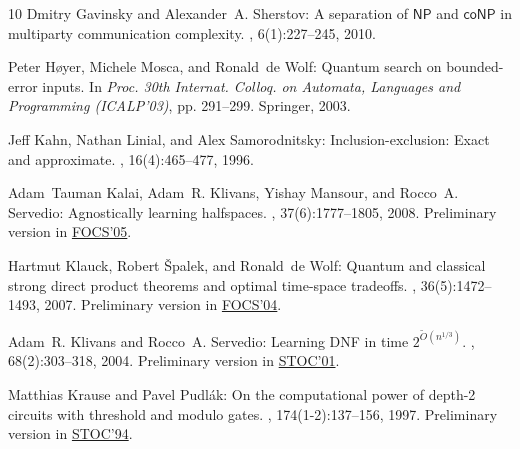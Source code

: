 \begin{thebibliography}{10}
{\sc Dmitry Gavinsky and Alexander~A. Sherstov}: A separation of
  {$\mathsf{NP}$} and {$\mathsf{coNP}$} in multiparty communication complexity.
, 6(1):227--245, 2010.

{\sc Peter H{\o}yer, Michele Mosca, and Ronald~de Wolf}: Quantum search on
  bounded-error inputs.
\newblock In {\em Proc. 30th Internat. Colloq. on Automata, Languages and
  Programming (ICALP'03)}, pp. 291--299. Springer, 2003.
\newblock [\epfmtdoi{10.1007/3-540-45061-0\_25}]

{\sc Jeff Kahn, Nathan Linial, and Alex Samorodnitsky}: Inclusion-exclusion:
  Exact and approximate.
, 16(4):465--477, 1996.
\newblock [\epfmtdoi{10.1007/BF01271266}]

{\sc Adam~Tauman Kalai, Adam~R. Klivans, Yishay Mansour, and Rocco~A.
  Servedio}: Agnostically learning halfspaces.
, 37(6):1777--1805, 2008.
\newblock Preliminary version in
  \href{http://dx.doi.org/10.1109/SFCS.2005.13}{FOCS'05}.
\newblock [\epfmtdoi{10.1137/060649057}]

{\sc Hartmut Klauck, Robert {\v S}palek, and Ronald~de Wolf}: Quantum and
  classical strong direct product theorems and optimal time-space tradeoffs.
, 36(5):1472--1493, 2007.
\newblock Preliminary version in
  \href{http://dx.doi.org/10.1109/FOCS.2004.52}{FOCS'04}.
\newblock [\epfmtdoi{10.1137/05063235X}]

{\sc Adam~R. Klivans and Rocco~A. Servedio}: Learning {DNF} in time {$2^{\tilde
  O(n^{1/3})}$}.
, 68(2):303--318, 2004.
\newblock Preliminary version in
  \href{http://dx.doi.org/10.1145/380752.380809}{STOC'01}.

{\sc Matthias Krause and Pavel Pudl{\'a}k}: On the computational power of
  depth-2 circuits with threshold and modulo gates.
, 174(1-2):137--156, 1997.
\newblock Preliminary version in
  \href{http://dx.doi.org/10.1145/195058.195103}{STOC'94}.
\newblock [\epfmtdoi{10.1016/S0304-3975(96)00019-9}]


\end{thebibliography}
